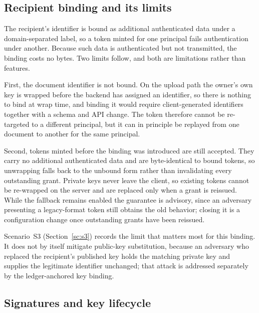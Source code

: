\documentclass[preprint,12pt]{elsarticle}
\begin{document}
\subsection{Recipient binding and its limits}
\label{sec:tokenformat}

The recipient's identifier is bound as additional authenticated data under a
domain-separated label, so a token minted for one principal fails
authentication under another. Because such data is authenticated but not
transmitted, the binding costs no bytes. Two limits follow, and both are
limitations rather than features.

First, the document identifier is not bound. On the upload path the owner's
own key is wrapped before the backend has assigned an identifier, so there is
nothing to bind at wrap time, and binding it would require client-generated
identifiers together with a schema and API change. The token therefore cannot
be re-targeted to a different principal, but it can in principle be replayed
from one document to another for the same principal.

Second, tokens minted before the binding was introduced are still accepted.
They carry no additional authenticated data and are byte-identical to bound
tokens, so unwrapping falls back to the unbound form rather than invalidating
every outstanding grant. Private keys never leave the client, so existing
tokens cannot be re-wrapped on the server and are replaced only when a grant is
reissued. While the fallback remains enabled the guarantee is advisory, since
an adversary presenting a legacy-format token still obtains the old behavior;
closing it is a configuration change once outstanding grants have been
reissued.

Scenario~S3 (Section~\ref{sc:s3}) records the limit that matters most for
this binding. It does not by itself mitigate public-key substitution, because
an adversary who replaced the recipient's published key holds the matching
private key and supplies the legitimate identifier unchanged; that attack is
addressed separately by the ledger-anchored key binding.

\subsection{Signatures and key lifecycle}
\label{sec:signatures}
\end{document}
